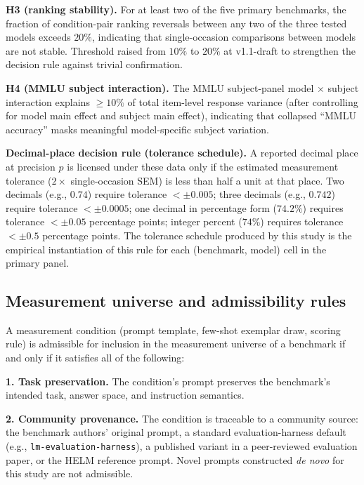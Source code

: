 \documentclass[11pt]{article}
\begin{document}
\textbf{H3 (ranking stability).} For at least two of the five primary benchmarks, the fraction of condition-pair ranking reversals between any two of the three tested models exceeds $20\%$, indicating that single-occasion comparisons between models are not stable. Threshold raised from $10\%$ to $20\%$ at v1.1-draft to strengthen the decision rule against trivial confirmation.

\textbf{H4 (MMLU subject interaction).} The MMLU subject-panel model $\times$ subject interaction explains $\geq 10\%$ of total item-level response variance (after controlling for model main effect and subject main effect), indicating that collapsed ``MMLU accuracy'' masks meaningful model-specific subject variation.

\textbf{Decimal-place decision rule (tolerance schedule).} A reported decimal place at precision $p$ is licensed under these data only if the estimated measurement tolerance ($2 \times$ single-occasion SEM) is less than half a unit at that place. Two decimals (e.g., $0.74$) require tolerance $< \pm 0.005$; three decimals (e.g., $0.742$) require tolerance $< \pm 0.0005$; one decimal in percentage form ($74.2\%$) requires tolerance $< \pm 0.05$ percentage points; integer percent ($74\%$) requires tolerance $< \pm 0.5$ percentage points. The tolerance schedule produced by this study is the empirical instantiation of this rule for each (benchmark, model) cell in the primary panel.

\subsection{Measurement universe and admissibility rules}
\label{app:prereg-universe}

A measurement condition (prompt template, few-shot exemplar draw, scoring rule) is admissible for inclusion in the measurement universe of a benchmark if and only if it satisfies all of the following:

\textbf{1. Task preservation.} The condition's prompt preserves the benchmark's intended task, answer space, and instruction semantics.

\textbf{2. Community provenance.} The condition is traceable to a community source: the benchmark authors' original prompt, a standard evaluation-harness default (e.g., \texttt{lm-evaluation-harness}), a published variant in a peer-reviewed evaluation paper, or the HELM reference prompt. Novel prompts constructed \emph{de novo} for this study are not admissible.
\end{document}
